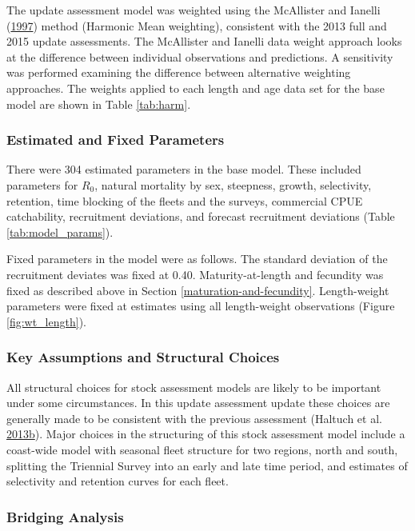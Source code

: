 \documentclass[12pt,]{article}
\begin{document}
The update assessment model was weighted using the McAllister and
Ianelli (\protect\hyperlink{ref-mcallister_bayesian_1997}{1997}) method
(Harmonic Mean weighting), consistent with the 2013 full and 2015 update
assessments. The McAllister and Ianelli data weight approach looks at
the difference between individual observations and predictions. A
sensitivity was performed examining the difference between alternative
weighting approaches. The weights applied to each length and age data
set for the base model are shown in Table \ref{tab:harm}.

\subsubsection{Estimated and Fixed
Parameters}\label{estimated-and-fixed-parameters}

There were 304 estimated parameters in the base model. These included
parameters for \(R_0\), natural mortality by sex, steepness, growth,
selectivity, retention, time blocking of the fleets and the surveys,
commercial CPUE catchability, recruitment deviations, and forecast
recruitment deviations (Table \ref{tab:model_params}).

Fixed parameters in the model were as follows. The standard deviation of
the recruitment deviates was fixed at 0.40. Maturity-at-length and
fecundity was fixed as described above in Section
\ref{maturation-and-fecundity}. Length-weight parameters were fixed at
estimates using all length-weight observations (Figure
\ref{fig:wt_length}).

\subsubsection{Key Assumptions and Structural
Choices}\label{key-assumptions-and-structural-choices}

All structural choices for stock assessment models are likely to be
important under some circumstances. In this update assessment update
these choices are generally made to be consistent with the previous
assessment (Haltuch et al.
\protect\hyperlink{ref-haltuch_status_2013}{2013}\protect\hyperlink{ref-haltuch_status_2013}{b}).
Major choices in the structuring of this stock assessment model include
a coast-wide model with seasonal fleet structure for two regions, north
and south, splitting the Triennial Survey into an early and late time
period, and estimates of selectivity and retention curves for each
fleet.

\subsubsection{Bridging Analysis}\label{bridging-analysis}
\end{document}

